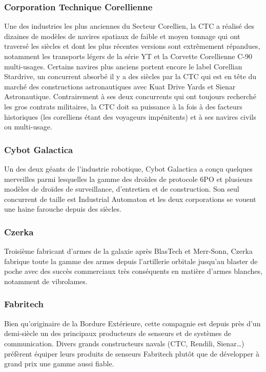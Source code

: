 \documentclass[twoside]{article}
\begin{document}
\subsubsection{Corporation Technique Corellienne }
Une des industries les plus anciennes du Secteur Corellien, la CTC a réalisé des dizaines de modèles de navires spatiaux de faible et moyen tonnage qui ont traversé les siècles et dont les plus récentes versions sont extrêmement répandues, notamment les transports légers de la série YT et la Corvette Corellienne C-90 multi-usages. Certains navires plus anciens portent encore le label Corellian Stardrive, un concurrent absorbé il y a des siècles par la CTC qui est en tête du marché des constructions astronautiques avec Kuat Drive Yards et Sienar Astronautique. Contrairement à ses deux concurrents qui ont toujours recherché les gros contrats militaires, la CTC doit sa puissance à la fois à des facteurs historiques (les corelliens étant des voyageurs impénitents) et à ses navires civils ou multi-usage.

\subsubsection{Cybot Galactica }
Un des deux géants de l'industrie robotique, Cybot Galactica a conçu quelques merveilles parmi lesquelles la gamme des droïdes de protocole 6PO et plusieurs modèles de droïdes de surveillance, d'entretien et de construction. Son seul concurrent de taille est Industrial Automaton et les deux corporations se vouent une haine farouche depuis des siècles.

\subsubsection{Czerka}
Troisième fabricant d'armes de la galaxie après BlasTech et Merr-Sonn, Czerka fabrique toute la gamme des armes depuis l'artillerie orbitale jusqu'au blaster de poche avec des succès commerciaux très conséquents en matière d'armes blanches, notamment de vibrolames.

\subsubsection{Fabritech}
Bien qu'originaire de la Bordure Extérieure, cette compagnie est depuis près d'un demi-siècle un des principaux producteurs de senseurs et de systèmes de communication. Divers grands constructeurs navals (CTC, Rendili, Sienar\ldots) préfèrent équiper leurs produits de senseurs Fabritech plutôt que de développer à grand prix une gamme aussi fiable.
\end{document}
